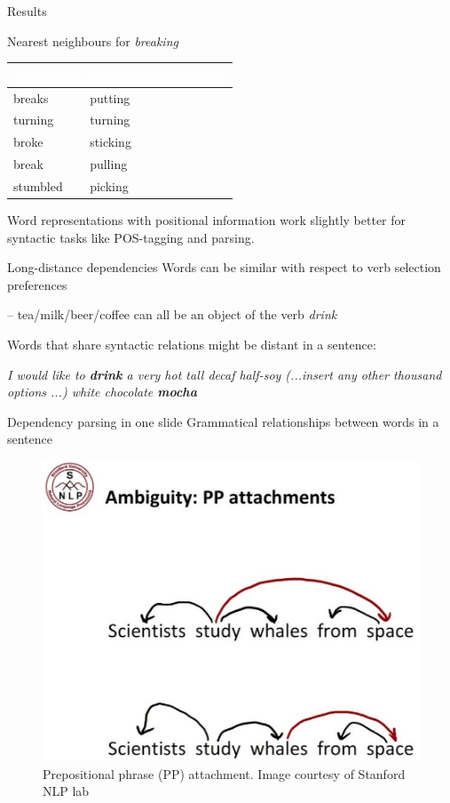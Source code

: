 \documentclass[12pt]{beamer}
\begin{document}
\begin{frame}{Results}
	

Nearest neighbours for \emph{breaking}


\begin{table}
	\begin{tabular}{l|l}
		\rowcolor{76abdf} \textcolor{white}{\textbf{Skip-gram}} & \textcolor{white}{\textbf{Structured Skip-gram}} \\ \toprule
		breaks & putting \\
		\rowcolor{gray!10} turning & turning \\
		broke & sticking \\
		\rowcolor{gray!10} break & pulling \\
		stumbled & picking \\
		\bottomrule
	\end{tabular}
\end{table}

\begin{small}
	Word representations with positional information work slightly better for syntactic tasks like POS-tagging and parsing.
\end{small}


	
\end{frame}

\begin{frame}{Long-distance dependencies}
Words can be similar with respect to verb selection preferences

-- tea/milk/beer/coffee can all be an object of the verb \emph{drink}

Words that share syntactic relations might be distant in a sentence:

\emph{I would like to \textbf{drink} a very hot tall decaf half-soy (...insert any other thousand options ...) white chocolate \textbf{mocha}}

\end{frame}

\begin{frame}{Dependency parsing in one slide}
Grammatical relationships between words in a sentence

\begin{figure}
\includegraphics[width=0.5\linewidth]{img/deptree1.png}
\caption{Prepositional phrase (PP) attachment. Image courtesy of Stanford NLP lab}
\end{figure}


\end{frame}
\end{document}

